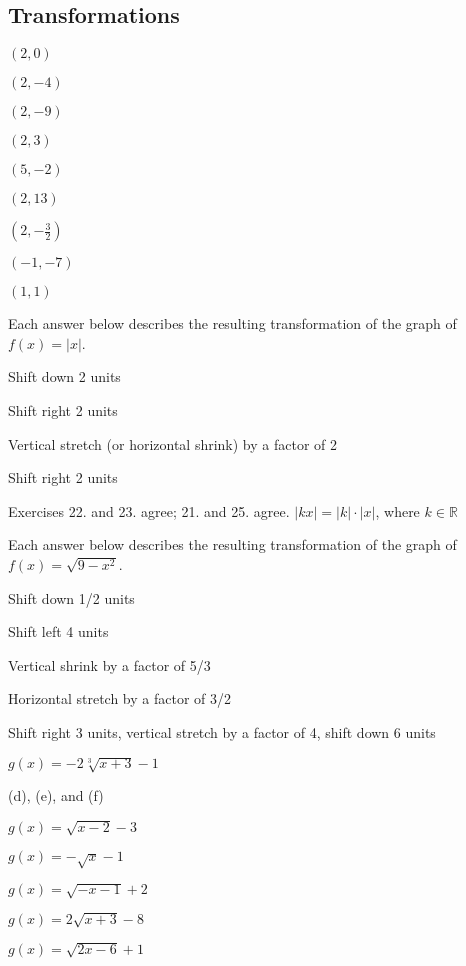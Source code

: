 \documentclass[12pt]{book}
\theoremstyle{definition}
\begin{document}
\subsection*{Transformations}


\begin{oddenumerate}
\begin{multicols}{4}
\item $(2,0)$
\item $(2,-4)$
\item $(2,-9)$
\item $(2,3)$
\item $(5,-2)$
\item $(2,13)$
\item $(2,-\frac{3}{2})$
\item $(-1,-7)$
\item $(1,1)$
\end{multicols}
\end{oddenumerate}
Each answer below describes the resulting transformation of the graph of $f(x)=|x|$.
\begin{oddenumerate}[resume]
\item Shift down 2 units
\item Shift right 2 units
\item Vertical stretch (or horizontal shrink) by a factor of 2
\item Shift right 2 units
\item Exercises 22. and 23. agree; 21. and 25. agree. $|kx|=|k|\cdot|x|$, where $k\in\mathbb{R}$
\end{oddenumerate}
Each answer below describes the resulting transformation of the graph of $f(x)=\sqrt{9-x^2}$.
\begin{oddenumerate}[resume]\item Shift down 1/2 units
\item Shift left 4 units
\item Vertical shrink by a factor of 5/3
\item Horizontal stretch by a factor of 3/2
\item Shift right 3 units, vertical stretch by a factor of 4, shift down 6 units
\begin{multicols}{2}
\item $g(x)=-2\sqrt[3]{x+3}-1$
\item (d), (e), and (f)
\item $g(x)=\sqrt{x-2}-3$
\item $g(x)=-\sqrt{x}-1$
\item $g(x)=\sqrt{-x-1}+2$
\item $g(x)=2\sqrt{x+3}-8$
\item $g(x)=\sqrt{2x-6}+1$
\end{multicols}
\end{oddenumerate}
\newpage
\end{document}
